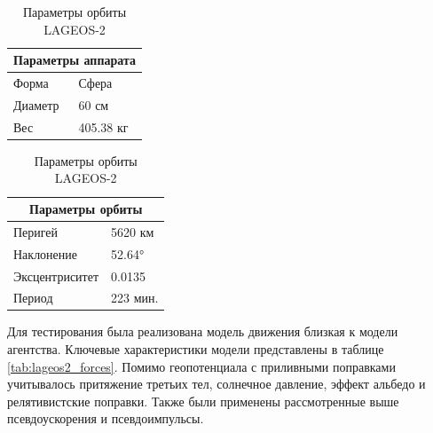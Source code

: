 \begin{table}[h!]
    \centering
    \begin{minipage}[t]{0.48\textwidth}
    \caption{Параметры аппарата LAGEOS-2}
    \centering
    \renewcommand{\arraystretch}{1.5}
    \begin{tabular}{|l|l|}
    \hline
    \multicolumn{2}{|c|}{Параметры аппарата} \\ \hline
    Форма       & Сфера      \\ \hline
    Диаметр     & 60 см      \\ \hline
    Вес         & 405.38 кг  \\ \hline
    \end{tabular}
    \label{tab:lageos2}
    \end{minipage}
    \hfill
    \begin{minipage}[t]{0.48\textwidth}
    \caption{Параметры орбиты LAGEOS-2}
    \centering
    \renewcommand{\arraystretch}{1.5}
    \begin{tabular}{|l|l|}
    \hline
    \multicolumn{2}{|c|}{Параметры орбиты} \\ \hline
    Перигей        & 5620 км   \\ \hline
    Наклонение     & 52.64°    \\ \hline
    Эксцентриситет & 0.0135    \\ \hline
    Период         & 223 мин.  \\ \hline
    \end{tabular}
    \label{tab:lageos2_orb}
    \end{minipage}
\end{table}

Для тестирования была реализована модель движения близкая к модели агентства.
Ключевые характеристики модели представлены в таблице \ref{tab:lageos2_forces}.
Помимо геопотенциала с приливными поправками учитывалось притяжение третьих тел,
солнечное давление, эффект альбедо и релятивистские поправки. Также были применены
рассмотренные выше псевдоускорения и псевдоимпульсы. 

